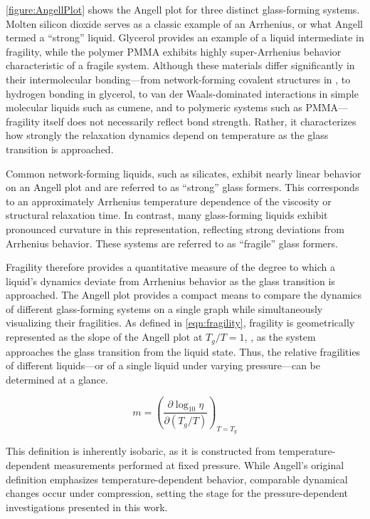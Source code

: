\fig\nolinebreak\ref{figure:AngellPlot} shows the Angell plot for three distinct glass-forming systems. Molten silicon dioxide serves as a classic example of an Arrhenius, or what Angell termed a ``strong'' liquid. Glycerol provides an example of a liquid intermediate in fragility, while the polymer PMMA exhibits highly super-Arrhenius behavior characteristic of a fragile system. Although these materials differ significantly in their intermolecular bonding---from network-forming covalent structures in , to hydrogen bonding in glycerol, to van der Waals-dominated interactions in simple molecular liquids such as cumene, and to polymeric systems such as PMMA---fragility itself does not necessarily reflect bond strength. Rather, it characterizes how strongly the relaxation dynamics depend on temperature as the glass transition is approached.

Common network-forming liquids, such as silicates, exhibit nearly linear behavior on an Angell plot and are referred to as ``strong'' glass formers. This corresponds to an approximately Arrhenius temperature dependence of the viscosity or structural relaxation time. In contrast, many glass-forming liquids exhibit pronounced curvature in this representation, reflecting strong deviations from Arrhenius behavior. These systems are referred to as ``fragile'' glass formers.

Fragility therefore provides a quantitative measure of the degree to which a liquid’s dynamics deviate from Arrhenius behavior as the glass transition is approached. The Angell plot provides a compact means to compare the dynamics of different glass-forming systems on a single graph while simultaneously visualizing their fragilities. As defined in \eqn\nolinebreak\ref{eqn:fragility}, fragility is geometrically represented as the slope of the Angell plot at $T_g/T = 1$, \ie, as the system approaches the glass transition from the liquid state. Thus, the relative fragilities of different liquids---or of a single liquid under varying pressure---can be determined at a glance.

\begin{equation}
	m=\left ( \frac{\partial \log_{10}\eta}{\partial \left ( T_g/T \right )} \right )_{T=T_g}
	\label{eqn:fragility}
\end{equation}

\noindent This definition is inherently isobaric, as it is constructed from temperature-dependent measurements performed at fixed pressure. While Angell’s original definition emphasizes temperature-dependent behavior, comparable dynamical changes occur under compression, setting the stage for the pressure-dependent investigations presented in this work.

